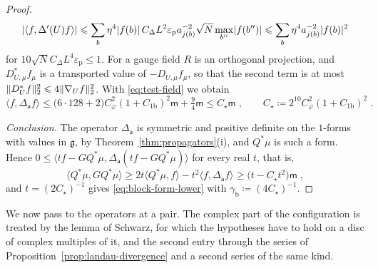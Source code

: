 \documentclass[11pt]{preprint}
\DeclarePairedDelimiter{\abs}{\lvert}{\rvert}
\DeclarePairedDelimiter{\norm}{\lVert}{\rVert}
\numberwithin{equation}{section}
\begin{document}
\begin{proof}
\[
    \abs{\langle f, \Delta'(U)f\rangle} \leqslant \sum_b\eta^4\abs{f(b)}\,C_\Delta L^2\varepsilon_{\mathrm p}a_{j(b)}^{-2}\sqrt N\max_{b''}\abs{f(b'')} \leqslant \sum_b\eta^4a_{j(b)}^{-2}\abs{f(b)}^2
\]
for $10\sqrt NC_\Delta L^4\varepsilon_{\mathrm p} \leqslant 1$. For a gauge field $R$ is an orthogonal projection, and $D^*_{U,\mu}f_\mu$ is a transported value of $-D_{U,\mu}f_\mu$, so that the second term is at most $\norm{D^*_Uf}_2^2 \leqslant 4\norm{\nabla_Uf}_2^2$. With \eqref{eq:test-field} we obtain
\[
    \langle f, \Delta_{\mathsf a}f\rangle \leqslant \bigl(6 \cdot 128 + 2\bigr)C_\varphi^2(1 + C_{1\mathrm b})^2\mathsf m + \tfrac{9}{4}\mathsf m \leqslant C_\star\mathsf m\;,
    \qquad
    C_\star \coloneqq 2^{10}C_\varphi^2(1 + C_{1\mathrm b})^2\;.
\]

\emph{Conclusion.} The operator $\Delta_{\mathsf a}$ is symmetric and positive definite on the $1$-forms with values in $\mathfrak g$, by Theorem~\ref{thm:propagators}(i), and $Q^*\mu$ is such a form. Hence $0 \leqslant \langle tf - GQ^*\mu, \Delta_{\mathsf a}(tf - GQ^*\mu)\rangle$ for every real $t$, that is,
\[
    \langle Q^*\mu, GQ^*\mu\rangle \geqslant 2t\langle Q^*\mu, f\rangle - t^2\langle f, \Delta_{\mathsf a}f\rangle \geqslant \bigl(t - C_\star t^2\bigr)\mathsf m\;,
\]
and $t = (2C_\star)^{-1}$ gives \eqref{eq:block-form-lower} with $\gamma_{\mathrm b} \coloneqq (4C_\star)^{-1}$.
\end{proof}

We now pass to the operators at a pair. The complex part of the configuration is treated by the lemma of Schwarz, for which the hypotheses have to hold on a disc of complex multiples of it, and the second entry through the series of Proposition~\ref{prop:landau-divergence} and a second series of the same kind.
\end{document}
